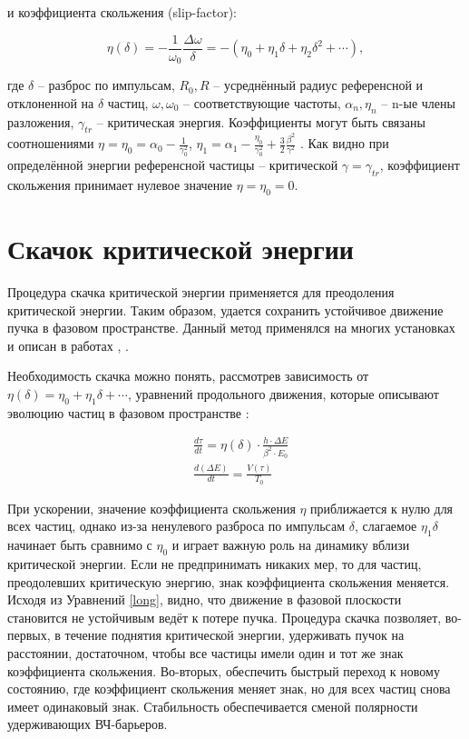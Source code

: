 \documentclass[a4paper,
               keeplastbox,   %
               ]{jacow}
\begin{document}
\par и коэффициента скольжения (slip-factor):

\begin{equation}
\eta(\delta)=-\frac{1}{\omega_0} \frac{\Delta \omega}{\delta}=-\left(\eta_0+\eta_1 \delta+\eta_2 \delta^2+\cdots\right),
\label{eta}
\end{equation}

где $\delta$ – разброс по импульсам, $R_{0},R$ – усреднённый радиус референсной и отклоненной на $\delta$ частиц, $\omega, \omega_{0}$ – соответствующие частоты, $\alpha_n, \eta_n$ – n-ые члены разложения, $\gamma_{tr}$ – критическая энергия. Коэффициенты могут быть связаны соотношениями $\eta=\eta_{0}=\alpha_{0}-\frac{1}{\gamma_{0}^{2}}$, $\eta_{1}=\alpha_{1}-\frac{\eta_{0}}{\gamma_{0}^{2}}+\frac{3}{2} \frac{\beta^{2}}{\gamma^{2}}$ . Как видно при определённой энергии референсной частицы – критической $\gamma = \gamma_{tr}$, коэффициент скольжения принимает нулевое значение $\eta = \eta_{0} = 0$.

\section{Скачок критической энергии}

\par Процедура скачка критической энергии применяется для преодоления критической энергии. Таким образом, удается сохранить устойчивое движение пучка в фазовом пространстве. Данный метод применялся на многих установках и описан в работах \cite{tr}, \cite{tr_pip}.

\par Необходимость скачка можно понять, рассмотрев зависимость от $\eta(\delta)=\eta_{0}+\eta_{1} \delta+\cdots$, уравнений продольного движения, которые описывают эволюцию частиц в фазовом пространстве \cite{BB_th}:

\begin{equation}
\begin{aligned}
& \frac{d \tau}{d t}=\eta(\delta) \cdot \frac{h \cdot \Delta E}{\beta^2 \cdot E_0} \\
& \frac{d(\Delta E)}{d t}=\frac{V(\tau)}{T_0}
\end{aligned}
\label{long}
\end{equation}

\par При ускорении, значение коэффициента скольжения $\eta$ приближается к нулю для всех частиц, однако из-за ненулевого разброса по импульсам $\delta$, слагаемое $\eta_1\delta$ начинает быть сравнимо с $\eta_0$ и играет важную роль на динамику вблизи критической энергии. Если не предпринимать никаких мер, то для частиц, преодолевших критическую энергию, знак коэффициента скольжения меняется. Исходя из Уравнений \ref{long}, видно, что движение в фазовой плоскости становится не устойчивым ведёт к потере пучка. Процедура скачка позволяет, во-первых, в течение поднятия критической энергии, удерживать пучок на расстоянии, достаточном, чтобы все частицы имели один и тот же знак коэффициента скольжения. Во-вторых, обеспечить быстрый переход к новому состоянию, где коэффициент скольжения меняет знак, но для всех частиц снова имеет одинаковый знак. Стабильность обеспечивается сменой полярности удерживающих ВЧ-барьеров.
\end{document}
